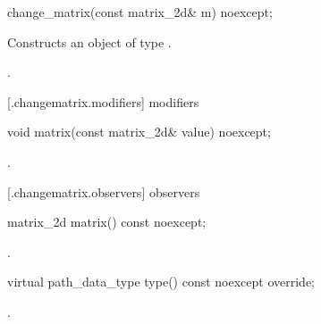 \begin{itemdecl}
    change_matrix(const matrix_2d& m) noexcept;
\end{itemdecl}
\begin{itemdescr}
	\pnum
	\effects
	Constructs an object of type .
	
	\pnum
	\postconditions
	.
\end{itemdescr}

 [\iotwod.changematrix.modifiers]{ modifiers}

\begin{itemdecl}
    void matrix(const matrix_2d& value) noexcept;
\end{itemdecl}
\begin{itemdescr}
	\pnum
	\postconditions
	.
	
\end{itemdescr}

 [\iotwod.changematrix.observers]{ observers}

\begin{itemdecl}
    matrix_2d matrix() const noexcept;
\end{itemdecl}
\begin{itemdescr}
	\pnum
	\returns
	.

\end{itemdescr}

\begin{itemdecl}
    virtual path_data_type type() const noexcept override;
\end{itemdecl}
\begin{itemdescr}
	\pnum
	\returns
	.

\end{itemdescr}
